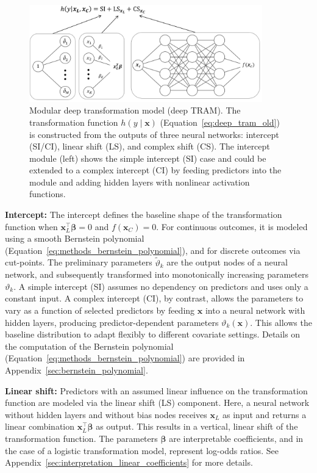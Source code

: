 \begin{figure}[H]
\centering
\includegraphics[width=0.9\textwidth]{img/deep_tram.png}
\caption{Modular deep transformation model (deep TRAM). The transformation function $h(y \mid \mathbf{x})$ (Equation~\ref{eq:deep_tram_old}) is constructed from the outputs of three neural networks: intercept (SI/CI), linear shift (LS), and complex shift (CS). The intercept module (left) shows the simple intercept (SI) case and could be extended to a complex intercept (CI) by feeding predictors into the module and adding hidden layers with nonlinear activation functions.}
\label{fig:deep_tram}
\end{figure}

\medskip


\textbf{Intercept:} The intercept defines the baseline shape of the transformation function when $\mathbf{x}_{L}^\top \boldsymbol{\beta} = 0$ and $f(\mathbf{x}_{C}) = 0$. For continuous outcomes, it is modeled using a smooth Bernstein polynomial (Equation~\ref{eq:methods_bernstein_polynomial}), and for discrete outcomes via cut-points. The preliminary parameters $\tilde{\vartheta}_k$ are the output nodes of a neural network, and subsequently transformed into monotonically increasing parameters $\vartheta_k$. A simple intercept (SI) assumes no dependency on predictors and uses only a constant input. A complex intercept (CI), by contrast, allows the parameters to vary as a function of selected predictors by feeding $\mathbf{x}$ into a neural network with hidden layers, producing predictor-dependent parameters $\vartheta_k(\mathbf{x})$. This allows the baseline distribution to adapt flexibly to different covariate settings. Details on the computation of the Bernstein polynomial (Equation~\ref{eq:methods_bernstein_polynomial}) are provided in Appendix~\ref{sec:bernstein_polynomial}.

\medskip

\textbf{Linear shift:} Predictors with an assumed linear influence on the transformation function are modeled via the linear shift (LS) component. Here, a neural network without hidden layers and without bias nodes receives $\mathbf{x}_{L}$ as input and returns a linear combination $\mathbf{x}_{L}^\top \boldsymbol{\beta}$ as output. This results in a vertical, linear shift of the transformation function. The parameters $\boldsymbol{\beta}$ are interpretable coefficients, and in the case of a logistic transformation model, represent log-odds ratios. See Appendix~\ref{sec:interpretation_linear_coefficients} for more details.

